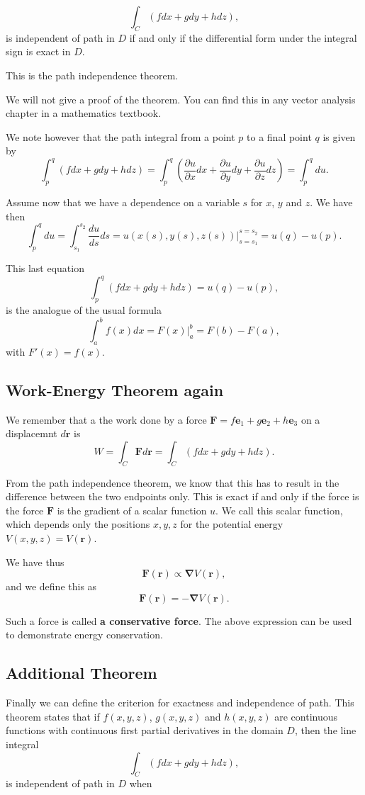 \documentclass[%
oneside,                 %
final,                   %
10pt]{article}
\begin{document}
\[
\int_C\left(fdx+gdy+hdz\right),
\]
is independent of path in $D$ if and only if the differential form under the integral sign is exact in $D$.

This is the path independence theorem. 

We will not give a proof of the theorem. You can find this in any vector analysis chapter in a mathematics textbook.

We note however that the path integral from a point $p$ to a final point $q$ is given by
\[
\int_p^q\left(fdx+gdy+hdz\right)=\int_p^q\left(\frac{\partial u}{\partial x}dx+\frac{\partial u}{\partial y}dy+\frac{\partial u}{\partial z}dz\right)=\int_p^qdu.
\]

Assume now that we have a dependence on a variable $s$ for $x$, $y$ and $z$. We have then
\[
\int_p^qdu=\int_{s_1}^{s_2}\frac{du}{ds}ds = u(x(s),y(s),z(s))\vert_{s=s_1}^{s=s_2}=u(q)-u(p).
\]

This last equation
\[
\int_p^q\left(fdx+gdy+hdz\right)=u(q)-u(p),
\]
is the analogue of the usual formula
\[
\int_a^bf(x)dx=F(x)\vert_a^b=F(b)-F(a),
\]
with $F'(x)=f(x)$.

\subsection{Work-Energy Theorem again}

We remember that a the work done by a force
$\bm{F}=f\bm{e}_1+g\bm{e}_2+h\bm{e}_3$ on a displacemnt $d\bm{r}$
is
\[
W=\int_C\bm{F}d\bm{r}=\int_C(fdx+gdy+hdz).
\]

From the path independence theorem, we know that this has to result in
the difference between the two endpoints only. This is exact if and
only if the force is the force $\bm{F}$ is the gradient of a scalar
function $u$. We call this scalar function, which depends only the
positions $x,y,z$ for the potential energy $V(x,y,z)=V(\bm{r})$.

We have thus
\[
\bm{F}(\bm{r})\propto \bm{\nabla}V(\bm{r}),
\]
and we define  this as
\[
\bm{F}(\bm{r})= -\bm{\nabla}V(\bm{r}).
\]

Such a force is called \textbf{a conservative force}. The above expression can be used to demonstrate
energy conservation.

\subsection{Additional Theorem}

Finally we can define the criterion for exactness and independence of
path. This theorem states that if $f(x,y,z)$, $g(x,y,z)$ and
$h(x,y,z)$ are continuous functions with continuous first partial derivatives in the domain $D$,
then the line integral
\[
\int_C\left(fdx+gdy+hdz\right),
\]
is independent of path in $D$ when
\end{document}
